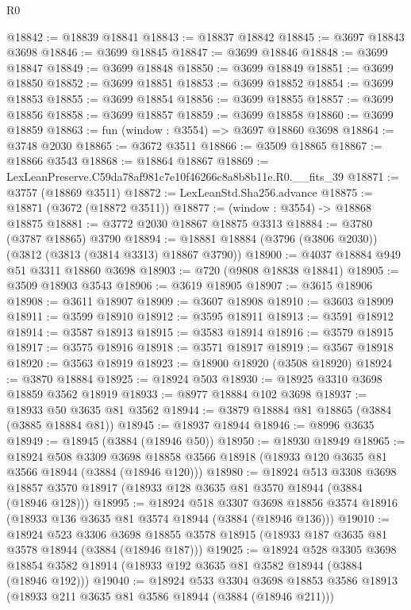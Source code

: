 \begin{lexlean}{R0}
\begin{coremodule}
@18842 := @18839 @18841
@18843 := @18837 @18842
@18845 := @3697 @18843 @3698
@18846 := @3699 @18845
@18847 := @3699 @18846
@18848 := @3699 @18847
@18849 := @3699 @18848
@18850 := @3699 @18849
@18851 := @3699 @18850
@18852 := @3699 @18851
@18853 := @3699 @18852
@18854 := @3699 @18853
@18855 := @3699 @18854
@18856 := @3699 @18855
@18857 := @3699 @18856
@18858 := @3699 @18857
@18859 := @3699 @18858
@18860 := @3699 @18859
@18863 := fun (window : @3554) => @3697 @18860 @3698
@18864 := @3748 @2030
@18865 := @3672 @3511
@18866 := @3509 @18865
@18867 := @18866 @3543
@18868 := @18864 @18867
@18869 := LexLeanPreserve.C59da78af981c7e10f46266c8a8b8b11e.R0.__fits_39
@18871 := @3757 (@18869 @3511)
@18872 := LexLeanStd.Sha256.advance
@18875 := @18871 (@3672 (@18872 @3511))
@18877 := (window : @3554) -> @18868 @18875
@18881 := @3772 @2030 @18867 @18875 @3313
@18884 := @3780 (@3787 @18865) @3790
@18894 := @18881 @18884 (@3796 (@3806 @2030)) (@3812 (@3813 (@3814 @3313) @18867 @3790))
@18900 := @4037 @18884 @949 @51 @3311 @18860 @3698
@18903 := @720 (@9808 @18838 @18841)
@18905 := @3509 @18903 @3543
@18906 := @3619 @18905
@18907 := @3615 @18906
@18908 := @3611 @18907
@18909 := @3607 @18908
@18910 := @3603 @18909
@18911 := @3599 @18910
@18912 := @3595 @18911
@18913 := @3591 @18912
@18914 := @3587 @18913
@18915 := @3583 @18914
@18916 := @3579 @18915
@18917 := @3575 @18916
@18918 := @3571 @18917
@18919 := @3567 @18918
@18920 := @3563 @18919
@18923 := @18900 @18920 (@3508 @18920)
@18924 := @3870 @18884
@18925 := @18924 @503
@18930 := @18925 @3310 @3698 @18859 @3562 @18919
@18933 := @8977 @18884 @102 @3698
@18937 := @18933 @50 @3635 @81 @3562
@18944 := @3879 @18884 @81 @18865 (@3884 (@3885 @18884 @81))
@18945 := @18937 @18944
@18946 := @8996 @3635
@18949 := @18945 (@3884 (@18946 @50))
@18950 := @18930 @18949
@18965 := @18924
    @508
    @3309
    @3698
    @18858
    @3566
    @18918
    (@18933 @120 @3635 @81 @3566 @18944 (@3884 (@18946 @120)))
@18980 := @18924
    @513
    @3308
    @3698
    @18857
    @3570
    @18917
    (@18933 @128 @3635 @81 @3570 @18944 (@3884 (@18946 @128)))
@18995 := @18924
    @518
    @3307
    @3698
    @18856
    @3574
    @18916
    (@18933 @136 @3635 @81 @3574 @18944 (@3884 (@18946 @136)))
@19010 := @18924
    @523
    @3306
    @3698
    @18855
    @3578
    @18915
    (@18933 @187 @3635 @81 @3578 @18944 (@3884 (@18946 @187)))
@19025 := @18924
    @528
    @3305
    @3698
    @18854
    @3582
    @18914
    (@18933 @192 @3635 @81 @3582 @18944 (@3884 (@18946 @192)))
@19040 := @18924
    @533
    @3304
    @3698
    @18853
    @3586
    @18913
    (@18933 @211 @3635 @81 @3586 @18944 (@3884 (@18946 @211)))

\end{coremodule}
\end{lexlean}
